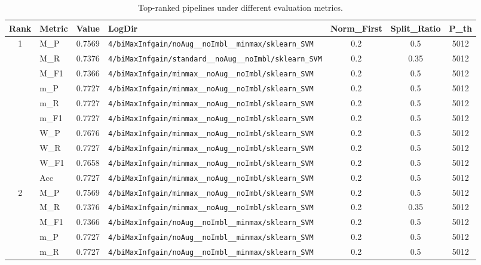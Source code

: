 \begin{table}[htbp]
\caption{Top-ranked pipelines under different evaluation metrics.}
\label{tab:rank_metric_vertical}
\centering
\small
\setlength{\tabcolsep}{4pt}
\begin{tabular}{|c|l|c|>{\ttfamily\footnotesize}p{7.2cm}|c|c|c|}
\hline
Rank & Metric & Value & LogDir & Norm\_First & Split\_Ratio & P\_th \\
\hline
\multirow{10}{*}{1} & M\_P & 0.7569 & \texttt{4/biMaxInfgain/noAug\_\_noImbl\_\_minmax/sklearn\_SVM} & 0.2 & 0.5  & 5012 \\ 
 & M\_R & 0.7376 & \texttt{4/biMaxInfgain/standard\_\_noAug\_\_noImbl/sklearn\_SVM} & 0.2 & 0.35  & 5012 \\ 
 & M\_F1 & 0.7366 & \texttt{4/biMaxInfgain/minmax\_\_noAug\_\_noImbl/sklearn\_SVM} & 0.2 & 0.5  & 5012 \\ 
 & m\_P & 0.7727 & \texttt{4/biMaxInfgain/minmax\_\_noAug\_\_noImbl/sklearn\_SVM} & 0.2 & 0.5  & 5012 \\ 
 & m\_R & 0.7727 & \texttt{4/biMaxInfgain/minmax\_\_noAug\_\_noImbl/sklearn\_SVM} & 0.2 & 0.5  & 5012 \\ 
 & m\_F1 & 0.7727 & \texttt{4/biMaxInfgain/minmax\_\_noAug\_\_noImbl/sklearn\_SVM} & 0.2 & 0.5  & 5012 \\ 
 & W\_P & 0.7676 & \texttt{4/biMaxInfgain/minmax\_\_noAug\_\_noImbl/sklearn\_SVM} & 0.2 & 0.5  & 5012 \\ 
 & W\_R & 0.7727 & \texttt{4/biMaxInfgain/minmax\_\_noAug\_\_noImbl/sklearn\_SVM} & 0.2 & 0.5  & 5012 \\ 
 & W\_F1 & 0.7658 & \texttt{4/biMaxInfgain/minmax\_\_noAug\_\_noImbl/sklearn\_SVM} & 0.2 & 0.5  & 5012 \\ 
 & Acc & 0.7727 & \texttt{4/biMaxInfgain/minmax\_\_noAug\_\_noImbl/sklearn\_SVM} & 0.2 & 0.5  & 5012 \\ 
\hline
\multirow{10}{*}{2} & M\_P & 0.7569 & \texttt{4/biMaxInfgain/minmax\_\_noAug\_\_noImbl/sklearn\_SVM} & 0.2 & 0.5  & 5012 \\ 
 & M\_R & 0.7376 & \texttt{4/biMaxInfgain/minmax\_\_noAug\_\_noImbl/sklearn\_SVM} & 0.2 & 0.35  & 5012 \\ 
 & M\_F1 & 0.7366 & \texttt{4/biMaxInfgain/noAug\_\_noImbl\_\_minmax/sklearn\_SVM} & 0.2 & 0.5  & 5012 \\ 
 & m\_P & 0.7727 & \texttt{4/biMaxInfgain/noAug\_\_noImbl\_\_minmax/sklearn\_SVM} & 0.2 & 0.5  & 5012 \\ 
 & m\_R & 0.7727 & \texttt{4/biMaxInfgain/noAug\_\_noImbl\_\_minmax/sklearn\_SVM} & 0.2 & 0.5  & 5012 \\ 

\end{tabular}
\end{table}
